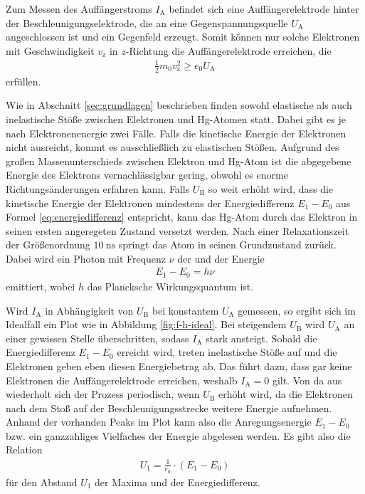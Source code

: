 \noindent
Zum Messen des Auffängerstroms $I_\text{A}$ befindet sich eine Auffängerelektrode hinter der Beschleunigungselektrode,
die an eine Gegenspannungsquelle $U_\text{A}$ angeschlossen ist und ein Gegenfeld erzeugt.
Somit können nur solche Elektronen mit Geschwindigkeit $v_\text{z}$ in $z$-Richtung die Auffängerelektrode erreichen, die 
\begin{align}
    \frac{1}{2} m_0 v^2_\text{z} \geq e_0 U_\text{A}
    \label{eq:v-kriterium}
\end{align}
erfüllen.

\noindent
Wie in Abschnitt \ref{sec:grundlagen} beschrieben finden sowohl elastische als auch inelastische Stöße zwischen Elektronen und Hg-Atomen statt.
Dabei gibt es je nach Elektronenenergie zwei Fälle.
Falls die kinetische Energie der Elektronen nicht ausreicht, kommt es ausschließlich zu elastischen Stößen.
Aufgrund des großen Massenunterschieds zwischen Elektron und Hg-Atom ist die abgegebene Energie des Elektrons vernachlässigbar gering,
obwohl es enorme Richtungsänderungen erfahren kann.
Falls $U_\text{B}$ so weit erhöht wird, 
dass die kinetische Energie der Elektronen mindestens der Energiedifferenz $E_1 - E_0$ aus Formel \eqref{eq:energiedifferenz} entspricht,
kann das Hg-Atom durch das Elektron in seinen ersten angeregeten Zustand versetzt werden.
Nach einer Relaxationszeit der Größenordnung $\qty{10}{\nano\second}$ springt das Atom in seinen Grundzustand zurück.
Dabei wird ein Photon mit Frequenz $\nu$ der und der Energie 
\begin{align}
    E_1 - E_0 = h \nu
    \label{eq:photon}
\end{align}
emittiert, wobei $h$ das Plancksche Wirkungsquantum ist.

\noindent
Wird $I_\text{A}$ in Abhängigkeit von $U_\text{B}$ bei konstantem $U_\text{A}$ gemessen, 
so ergibt sich im Idealfall ein Plot wie in Abbildung \ref{fig:f-h-ideal}.
Bei steigendem $U_\text{B}$ wird $U_\text{A}$ an einer gewissen Stelle überschritten, sodass $I_\text{A}$ stark ansteigt.
Sobald die Energiedifferenz $E_1 - E_0$ erreicht wird, treten inelastische Stöße auf und die Elektronen geben eben diesen Energiebetrag ab.
Das führt dazu, dass gar keine Elektronen die Auffängerelektrode erreichen, weshalb $I_\text{A} = 0$ gilt.
Von da aus wiederholt sich der Prozess periodisch, wenn $U_\text{B}$ erhöht wird, da die Elektronen nach dem Stoß auf der Beschleunigungsstrecke weitere Energie aufnehmen. 
Anhand der vorhanden Peaks im Plot kann also die Anregungsenergie $E_1 - E_0$ bzw. ein ganzzahliges Vielfaches der Energie abgelesen werden.
Es gibt also die Relation 
\begin{align}
    U_1 = \frac{1}{e_0} \cdot \left(E_1 - E_0\right)
    \label{eq:U_1}
\end{align}
für den Abstand $U_1$ der Maxima und der Energiedifferenz.

